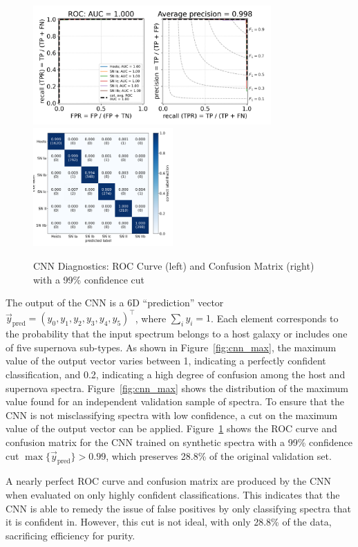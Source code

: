\begin{figure}[b]
    \centering
    \includegraphics[height=4.55cm]{figures/cnn/cnn_roc99.png}
    \quad
    \includegraphics[height=4.55cm]{figures/cnn/cnn_cm99.png}
    \caption[CNN diagnostics with a confidence cut]{CNN Diagnostics: ROC Curve (left) and Confusion Matrix (right) with a 99\% confidence cut\label{fig:cnn_qual2}}
\end{figure}

The output of the CNN is a 6D ``prediction'' vector $\vec{y}_\mathrm{pred}=(y_0,y_1,y_2,y_3,y_4,y_5)^\intercal$, where $\sum_i y_i=1$. Each element corresponds to the probability that the input spectrum belongs to a host galaxy or includes one of five supernova sub-types.
As shown in Figure~\ref{fig:cnn_max}, the maximum value of the output vector varies  between 1, indicating a perfectly confident classification, and 0.2, indicating a high degree of confusion among the host and supernova spectra. Figure~\ref{fig:cnn_max} shows
the distribution of the maximum value found for an independent validation sample of spectra. To ensure that the CNN is not
misclassifying spectra with low confidence, a cut on the maximum value of the
output vector can be applied. Figure~\ref{fig:cnn_qual2} shows the ROC curve and confusion matrix
for the CNN trained on synthetic spectra with a 99\% confidence cut $\max{\{\vec{y}_\mathrm{pred}\}}>0.99$, which preserves 
28.8\% of the original validation set. 


A nearly perfect ROC curve and confusion matrix are produced by the CNN when
evaluated on only highly confident classifications. This indicates that the CNN
is able to remedy the issue of false positives by only classifying spectra that
it is confident in. However, this cut is not ideal, with only 28.8\% of the
data, sacrificing efficiency for purity.


